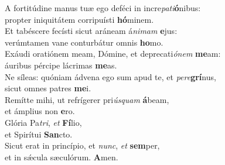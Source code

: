 \evenverse A fortitúdine manus tuæ ego deféci in incre\textit{pa}\textit{ti}\textbf{ó}nibus:~\*\\
\evenverse propter iniquitátem corripuísti \textbf{hó}minem.\\
\oddverse Et tabéscere fecísti sicut aráneam á\textit{ni}\textit{mam} \textbf{e}jus:~\*\\
\oddverse verúmtamen vane conturbátur omnis \textbf{ho}mo.\\
\evenverse Exáudi oratiónem meam, Dómine, et deprecati\textit{ó}\textit{nem} \textbf{me}am:~\*\\
\evenverse áuribus pércipe lácrimas \textbf{me}as.\\
\oddverse Ne síleas: quóniam ádvena ego sum apud te, et \textit{pe}\textit{re}\textbf{grí}nus,~\*\\
\oddverse sicut omnes patres \textbf{me}i.\\
\evenverse Remítte mihi, ut refrígerer pri\textit{ús}\textit{quam} \textbf{á}beam,~\*\\
\evenverse et ámplius non \textbf{e}ro.\\
\oddverse Glória Pa\textit{tri}, \textit{et} \textbf{Fí}lio,~\*\\
\oddverse et Spirítui \textbf{San}cto.\\
\evenverse Sicut erat in princípio, et \textit{nunc}, \textit{et} \textbf{sem}per,~\*\\
\evenverse et in sǽcula sæculórum. \textbf{A}men.\\
